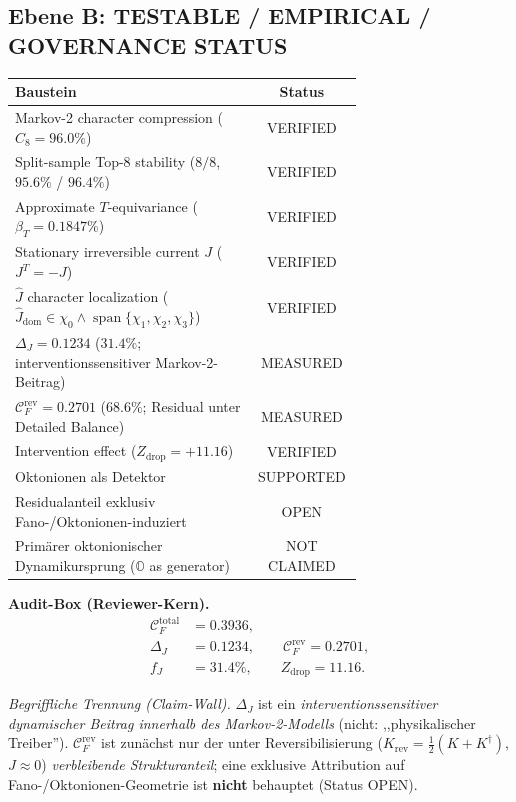 \documentclass[11pt,a4paper]{article}
\begin{document}
\subsection*{Ebene B: TESTABLE / EMPIRICAL / GOVERNANCE STATUS}
\begin{center}
\begin{tabular}{>{\raggedright\arraybackslash}p{0.69\linewidth}|c}
\toprule
\textbf{Baustein} & \textbf{Status}\\
\midrule
Markov-2 character compression ($C_8 = 96.0\%$) & VERIFIED\\
Split-sample Top-8 stability ($8/8$, $95.6\%$ / $96.4\%$) & VERIFIED\\
Approximate $T$-equivariance ($\beta_T = 0.1847\%$) & VERIFIED\\
Stationary irreversible current $J$ ($J^T = -J$) & VERIFIED\\
$\widehat{J}$ character localization ($\widehat{J}_{\mathrm{dom}} \in \chi_0 \wedge \operatorname{span}\{\chi_1, \chi_2, \chi_3\}$) & VERIFIED\\
$\Delta_J = 0.1234$ ($31.4\%$; interventionssensitiver Markov-2-Beitrag) & MEASURED\\
$\mathcal{C}_F^{\mathrm{rev}} = 0.2701$ ($68.6\%$; Residual unter Detailed Balance) & MEASURED\\
Intervention effect ($Z_{\mathrm{drop}} = +11.16$) & VERIFIED\\
Oktonionen als Detektor & SUPPORTED\\
Residualanteil exklusiv Fano-/Oktonionen-induziert & OPEN\\
Primärer oktonionischer Dynamikursprung ($\mathbb{O}$ as generator) & NOT CLAIMED\\
\bottomrule
\end{tabular}
\end{center}

\noindent\textbf{Audit-Box (Reviewer-Kern).}
\[
\boxed{
\begin{aligned}
\mathcal{C}_F^{\mathrm{total}} &= 0.3936,\\
\Delta_J &= 0.1234,\qquad
\mathcal{C}_F^{\mathrm{rev}} = 0.2701,\\
f_J &= 31.4\%,\qquad
Z_{\mathrm{drop}} = 11.16.
\end{aligned}
}
\]

\noindent\emph{Begriffliche Trennung (Claim-Wall).}
$\Delta_J$ ist ein \emph{interventionssensitiver dynamischer Beitrag innerhalb des Markov-2-Modells}
(nicht: ,,physikalischer Treiber'').
$\mathcal{C}_F^{\mathrm{rev}}$ ist zunächst nur der unter Reversibilisierung ($K_{\mathrm{rev}}=\tfrac12(K+K^\dagger)$, $J\approx 0$)
\emph{verbleibende Strukturanteil}; eine exklusive Attribution auf Fano-/Oktonionen-Geometrie ist \textbf{nicht} behauptet (Status OPEN).
\end{document}
